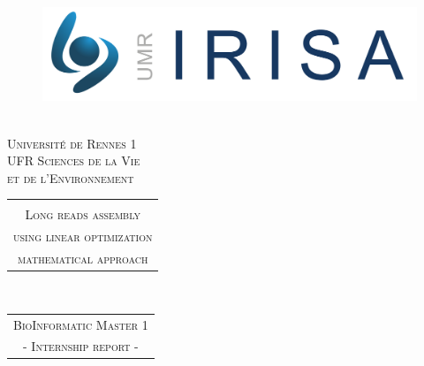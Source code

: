 \begin{titlepage}
\begin{center}
\begin{minipage}{\linewidth}
\begin{minipage}{0.21\linewidth}
\begin{figure}[H]
              \end{figure}
          \end{minipage}
          \hspace{0.03\linewidth}
          \begin{minipage}{0.21\linewidth}
              \begin{figure}[H]
                  \centering
                  \includegraphics[width=\linewidth]{pictures/IrisaLogo.png}
              \end{figure}
          \end{minipage}
      \end{minipage}
    \end{center}

    \begin{center}

        ~\\[1cm]
        \textsc{\LARGE Université de Rennes 1} \\[0.2cm]
        \textsc{\Large UFR Sciences de la Vie} \\[0.1cm]
        \textsc{\Large et de l'Environnement} \\[1cm]

        \begin{tabular}{c}
          \hline \\
          \LARGE{\textsc{Long reads assembly}} \\[0.2cm]
          \LARGE{\textsc{using linear optimization}} \\[0.2cm]
          \LARGE{\textsc{mathematical approach}} \\[0.5cm]
          \hline
        \end{tabular} \\[1cm]

        \begin{tabular}{c}
          \LARGE{\textsc{BioInformatic Master 1}} \\[0.2cm]
          \LARGE{\textsc{- Internship report -}} \\
        \end{tabular} \\[1cm]


\end{center}
\end{titlepage}
